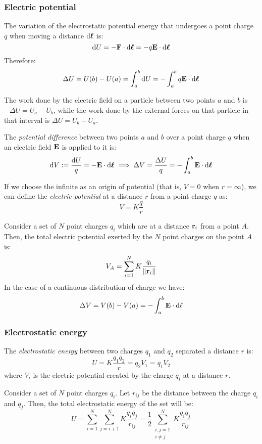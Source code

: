 \documentclass[../../../main.tex]{subfiles}
\begin{document}
\begin{multicols}{2}
  \subsubsection*{Electric potential}
  \begin{prop}
    The variation of the electrostatic potential energy that undergoes a point charge $q$ when moving a distance $\dd\vb*{\ell}$ is:
    $$\dd U=-\vb{F}\cdot \dd\vb*{\ell}=-q\vb{E}\cdot \dd\vb*{\ell}$$
    Therefore:
    $$\Delta U=U(b)-U(a)=\int_a^b\dd U=-\int_a^bq\vb{E}\cdot \dd \vb*{\ell}$$
  \end{prop}
  \begin{prop}
    The work done by the electric field on a particle between two points $a$ and $b$ is $-\Delta U=U_a-U_b$, while the work done by the external forces on that particle in that interval is $\Delta U=U_b-U_a$.
  \end{prop}
  \begin{definition}
    The \textit{potential difference} between two points $a$ and $b$ over a point charge $q$ when an electric field $\vb{E}$ is applied to it is:
    $$\dd V:=\frac{\dd U}{q}=-\vb{E}\cdot\dd \vb*{\ell}\implies\Delta V=\frac{\Delta U}{q}=-\int_a^b\vb{E}\cdot\dd \vb*{\ell}$$
  \end{definition}
  \begin{definition}
    If we choose the infinite as an origin of potential (that is, $V=0$ when $r=\infty$), we can define the \textit{electric potential} at a distance $r$ from a point charge $q$ as: $$V=K\frac{q}{r}$$
  \end{definition}
  \begin{principle}
    Consider a set of $N$ point charges $q_i$ which are at a distance $\vb{r}_i$ from a point $A$. Then, the total electric potential exerted by the $N$ point charges on the point $A$ is:
    $$V_A=\sum_{i=1}^NK\frac{q_i}{\|\vb{r}_{i}\|}$$
    In the case of a continuous distribution of charge we have:
    $$\Delta V=V(b)-V(a)=-\int_a^b\vb{E}\cdot\dd\ell$$
  \end{principle}
  \subsubsection*{Electrostatic energy}
  \begin{definition}
    The \textit{electrostatic energy} between two charges $q_1$ and $q_2$ separated a distance $r$ is: $$U=K\frac{q_1q_2}{r}=q_2V_1=q_1V_2$$
    where $V_i$ is the electric potential created by the charge $q_i$ at a distance $r$.
  \end{definition}
  \begin{prop}
    Consider a set of $N$ point charges $q_i$. Let $r_{ij}$ be the distance between the charge $q_i$ and $q_j$. Then, the total electrostatic energy of the set will be: $$U=\sum_{i=1}^N\sum_{j=i+1}^NK\frac{q_iq_j}{r_{ij}}=\frac{1}{2}\sum_{\substack{i,j=1\\i\ne j}}^NK\frac{q_iq_j}{r_{ij}}$$
  \end{prop}

\end{multicols}
\end{document}
